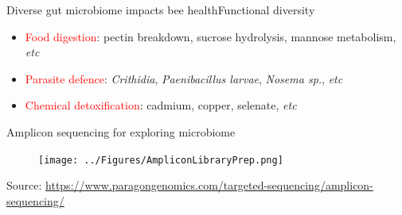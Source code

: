 \documentclass{beamer}
\begin{document}
\begin{frame}{Diverse gut microbiome impacts bee health}{Functional diversity}
    \begin{itemize}
        \item \textcolor{red}{Food digestion}:
        \newline pectin breakdown,
        \newline sucrose hydrolysis,
        \newline mannose metabolism, \textit{etc}
        \item \textcolor{red}{Parasite defence}:
        \newline \textit{Crithidia}, 
        \newline \textit{Paenibacillus larvae}, 
        \newline \textit{Nosema sp.}, \textit{etc}
        \item \textcolor{red}{Chemical detoxification}:
        \newline cadmium, 
        \newline copper, 
        \newline selenate, \textit{etc}
    \end{itemize}
\end{frame}

\begin{frame}{Amplicon sequencing for exploring microbiome}
    \begin{figure}
        \texttt{[image: ../Figures/AmpliconLibraryPrep.png]}
    \end{figure}
    \centering
    Source: \href{https://www.paragongenomics.com/targeted-sequencing/amplicon-sequencing/}{https://www.paragongenomics.com/targeted-sequencing/amplicon-sequencing/}
\end{frame}
\end{document}
